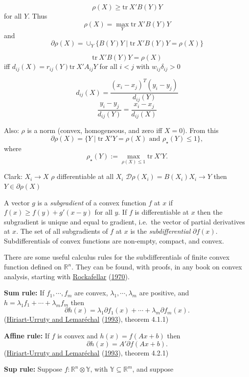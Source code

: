 \documentclass[
  12pt,
]{book}
\theoremstyle{definition}
\theoremstyle{definition}
\theoremstyle{definition}
\theoremstyle{definition}
\theoremstyle{remark}
\begin{document}
\[\rho(X)\geq\text{tr}\ X'B(Y)Y\] for all \(Y\). Thus \[\rho(X)=\max_Y\text{tr}\ X'B(Y)Y\]
and
\[
\partial\rho(X)=\mathop{\cup}_Y\{B(Y)Y\mid\text{tr}\ X'B(Y)Y=\rho(X)\}
\]

\[\text{tr}\ X'B(Y)Y=\rho(X)\] iff \(d_{ij}(X)=r_{ij}(Y)\text{tr}\ X'A_{ij}Y\) for all \(i<j\) with \(w_{ij}\delta_{ij}>0\)

\[d_{ij}(X)=\frac{(x_i-x_j)^T(y_i-y_j)}{d_{ij}(Y)}\]
\[
\frac{y_i-y_j}{d_{ij}(Y)}=\frac{x_i-x_j}{d_{ij}(X)}
\]

Also: \(\rho\) is a norm (convex, homogeneous, and zero iff \(X=0\)). From this
\[
\partial\rho(X)=\{Y\mid\text{tr}\ X'Y=\rho(X)\text{ and }\rho_\star(Y)\leq 1\},
\]
where
\[
\rho_\star(Y):=\max_{\rho(X)\leq 1}\text{tr}\ X'Y.
\]

Clark: \(X_i\rightarrow X\)
\(\rho\) differentiable at all \(X_i\)
\(\mathcal{D}\rho(X_i)=B(X_i)X_i\rightarrow Y\)
then \(Y\in\partial\rho(X)\)

A vector \(g\) is a \emph{subgradient} of a convex function \(f\) at \(x\) if \(f(x)\geq f(y)+g'(x-y)\) for all \(y\). If \(f\) is differentiable at \(x\) then the subgradient is unique and equal to gradient, i.e.~the vector of partial derivatives at \(x\). The set of all subgradients of \(f\) at \(x\) is the \emph{subdifferential} \(\partial f(x)\). Subdifferentials of convex functions are non-empty, compact, and convex.

There are some useful calculus rules for the subdifferentials of finite convex function defined on \(\mathbb{R}^n\). They can be found, with proofs, in any book on convex analysis, starting with \protect\hyperlink{ref-rockafellar_70}{Rockafellar} (\protect\hyperlink{ref-rockafellar_70}{1970}).

\textbf{Sum rule:} If \(f_1,\cdots,f_m\) are convex, \(\lambda_1,\cdots,\lambda_m\) are positive, and \(h=\lambda_1 f_1+\cdots+\lambda_mf_m\) then
\[
\partial h(x)=\lambda_1\partial f_1(x)+\cdots+\lambda_m\partial f_m(x).
\]
(\protect\hyperlink{ref-hiriart-urruty_lemarechal_93a}{Hiriart-Urruty and Lemaréchal} (\protect\hyperlink{ref-hiriart-urruty_lemarechal_93a}{1993}), theorem 4.1.1)

\textbf{Affine rule:} If \(f\) is convex and \(h(x)=f(Ax+b)\) then
\[
\partial h(x)=A'\partial f(Ax+b).
\]
(\protect\hyperlink{ref-hiriart-urruty_lemarechal_93a}{Hiriart-Urruty and Lemaréchal} (\protect\hyperlink{ref-hiriart-urruty_lemarechal_93a}{1993}), theorem 4.2.1)

\textbf{Sup rule:} Suppose \(f:\mathbb{R}^n\otimes \mathbb{Y}\), with \(\mathbb{Y}\subseteq\mathbb{R}^m\), and suppose
\end{document}
